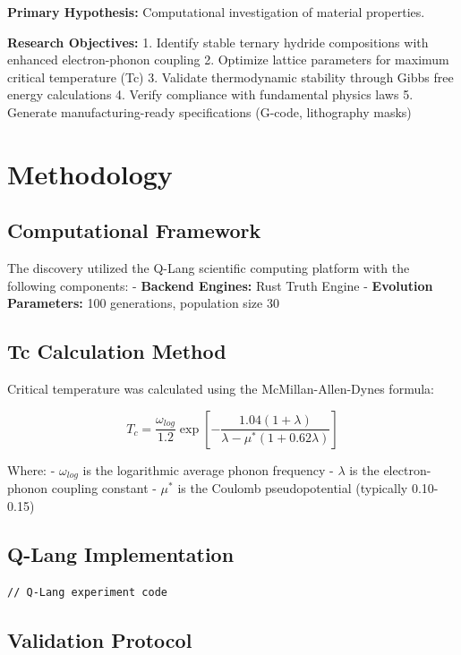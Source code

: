 \documentclass[12pt,a4paper]{article}
\begin{document}
\textbf{Primary Hypothesis:} Computational investigation of material properties.

\textbf{Research Objectives:}
1. Identify stable ternary hydride compositions with enhanced electron-phonon coupling
2. Optimize lattice parameters for maximum critical temperature (Tc)
3. Validate thermodynamic stability through Gibbs free energy calculations
4. Verify compliance with fundamental physics laws
5. Generate manufacturing-ready specifications (G-code, lithography masks)

\section{Methodology} 

\subsection{Computational Framework}

The discovery utilized the Q-Lang scientific computing platform with the following components:
- \textbf{Backend Engines:} Rust Truth Engine
- \textbf{Evolution Parameters:} 100 generations, population size 30

\subsection{Tc Calculation Method}

Critical temperature was calculated using the McMillan-Allen-Dynes formula:

$$T_c = \frac{\omega_{log}}{1.2} \exp\left[-\frac{1.04(1+\lambda)}{\lambda - \mu^*(1+0.62\lambda)}\right]$$

Where:
- $\omega_{log}$ is the logarithmic average phonon frequency
- $\lambda$ is the electron-phonon coupling constant
- $\mu^*$ is the Coulomb pseudopotential (typically 0.10-0.15)

\subsection{Q-Lang Implementation}

\begin{verbatim}
// Q-Lang experiment code
\end{verbatim}

\subsection{Validation Protocol}
\end{document}

